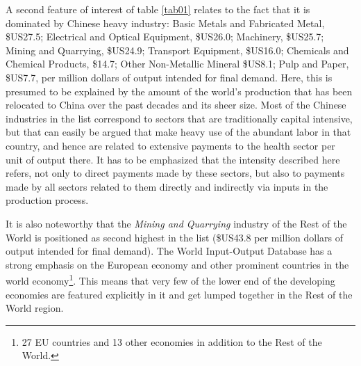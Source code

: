 \documentclass[a4paper,12pt]{article}
\begin{document}
A second feature of interest of table \ref{tab01} relates to the fact that it is dominated by Chinese heavy industry: Basic Metals and Fabricated Metal, \$US27.5; Electrical and Optical Equipment, \$US26.0; Machinery, \$US25.7; Mining and Quarrying, \$US24.9; Transport Equipment, \$US16.0; Chemicals and Chemical Products, \$14.7; Other Non-Metallic Mineral \$US8.1; Pulp and Paper, \$US7.7, per million dollars of output intended for final demand. Here, this is presumed to be explained by the amount of the world's production that has been relocated to China over the past decades and its sheer size. Most of the Chinese industries in the list correspond to sectors that are traditionally capital intensive, but that can easily be argued that make heavy use of the abundant labor in that country, and hence are related to extensive payments to the health sector per unit of output there. It has to be emphasized that the intensity described here refers, not only to direct payments made by these sectors, but also to payments made by all sectors related to them directly and indirectly via inputs in the production process. 

It is also noteworthy that the \textit{Mining and Quarrying} industry of the Rest of the World is positioned as second highest in the list (\$US43.8 per million dollars of output intended for final demand). 
The World Input-Output Database has a strong emphasis on the European economy and other prominent countries in the world economy\footnote{27 EU countries and 13 other economies in addition to the Rest of the World.}. This means that very few of the lower end of the developing economies are featured explicitly in it and get lumped together in the Rest of the World region.
\end{document}
